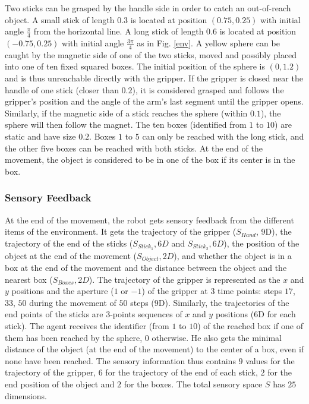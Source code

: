\documentclass[10pt,letterpaper]{article}
\begin{document}
			Two sticks can be grasped by the handle side in order to catch an out-of-reach object.
			A small stick of length $0.3$ is located at position $(0.75, 0.25)$ with initial angle $\frac{\pi}{4}$ from the horizontal line.
			A long stick of length $0.6$ is located at position $(-0.75, 0.25)$ with initial angle $\frac{3\pi}{4}$ as in Fig. \ref{env}.	
			A yellow sphere can be caught by the magnetic side of one of the two sticks, moved and possibly placed into one of ten fixed squared boxes. 
			The initial position of the sphere is $(0, 1.2)$ and is thus unreachable directly with the gripper.		
			If the gripper is closed near the handle of one stick (closer than $0.2$), it is considered grasped and follows the gripper's position and the angle of the arm's last segment until the gripper opens.			
			Similarly, if the magnetic side of a stick reaches the sphere (within $0.1$), the sphere will then follow the magnet.
			The ten boxes (identified from $1$ to $10$) are static and have size $0.2$.
			Boxes $1$ to $5$ can only be reached with the long stick, and the other five boxes can be reached with both sticks.
			At the end of the movement, the object is considered to be in one of the box if its center is in the box.
		
		
		\subsubsection{Sensory Feedback}
		
			At the end of the movement, the robot gets sensory feedback from the different items of the environment.
			It gets the trajectory of the gripper ($S_{Hand}$, $9$D), the trajectory of the end of the sticks ($S_{Stick_1}, $6$D$ and $S_{Stick_2}, $6$D$), 
			the position of the object at the end of the movement ($S_{Object}, $2$D$), and whether the object is in a box at the end of the movement and the distance between the object and the nearest box ($S_{Boxes}, $2$D$).		
			The trajectory of the gripper is represented as the $x$ and $y$ positions and the aperture ($1$ or $-1$) of the gripper at $3$ time points: 
			steps $17$, $33$, $50$ during the movement of $50$ steps ($9$D).
			Similarly, the trajectories of the end points of the sticks are $3$-points sequences of $x$ and $y$ positions ($6$D for each stick).
			The agent receives the identifier (from $1$ to $10$) of the reached box if one of them has been reached by the sphere, 0 otherwise. 
			He also gets the minimal distance of the object (at the end of the movement) to the center of a box, even if none have been reached.			 
			The sensory information thus contains $9$ values for the trajectory of the gripper, $6$ for the trajectory of the end of each stick, $2$ for the end position of the object and $2$ for the boxes.
			The total sensory space $S$ has $25$ dimensions.
			
\end{document}
